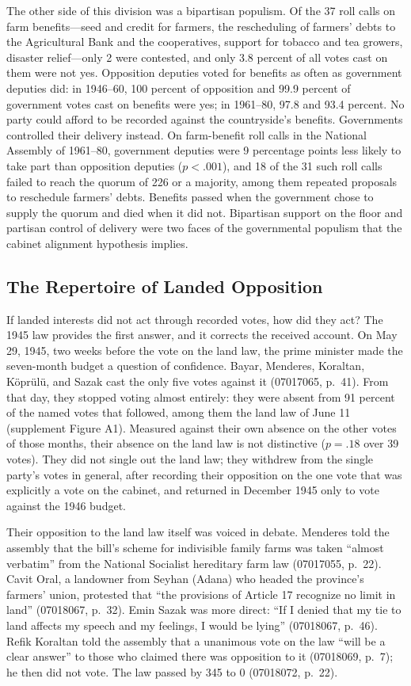 \documentclass[12pt]{article}
\begin{document}
The other side of this division was a bipartisan populism. Of the 37 roll calls on farm benefits---seed and credit for farmers, the rescheduling of farmers' debts to the Agricultural Bank and the cooperatives, support for tobacco and tea growers, disaster relief---only 2 were contested, and only 3.8 percent of all votes cast on them were not yes. Opposition deputies voted for benefits as often as government deputies did: in 1946--60, 100 percent of opposition and 99.9 percent of government votes cast on benefits were yes; in 1961--80, 97.8 and 93.4 percent. No party could afford to be recorded against the countryside's benefits. Governments controlled their delivery instead. On farm-benefit roll calls in the National Assembly of 1961--80, government deputies were 9 percentage points less likely to take part than opposition deputies ($p<.001$), and 18 of the 31 such roll calls failed to reach the quorum of 226 or a majority, among them repeated proposals to reschedule farmers' debts. Benefits passed when the government chose to supply the quorum and died when it did not. Bipartisan support on the floor and partisan control of delivery were two faces of the governmental populism that the cabinet alignment hypothesis implies.

\subsection*{The Repertoire of Landed Opposition}

If landed interests did not act through recorded votes, how did they act? The 1945 law provides the first answer, and it corrects the received account. On May 29, 1945, two weeks before the vote on the land law, the prime minister made the seven-month budget a question of confidence. Bayar, Menderes, Koraltan, Köprülü, and Sazak cast the only five votes against it (07017065, p.~41). From that day, they stopped voting almost entirely: they were absent from 91 percent of the named votes that followed, among them the land law of June 11 (supplement Figure A1). Measured against their own absence on the other votes of those months, their absence on the land law is not distinctive ($p=.18$ over 39 votes). They did not single out the land law; they withdrew from the single party's votes in general, after recording their opposition on the one vote that was explicitly a vote on the cabinet, and returned in December 1945 only to vote against the 1946 budget.

Their opposition to the land law itself was voiced in debate. Menderes told the assembly that the bill's scheme for indivisible family farms was taken ``almost verbatim'' from the National Socialist hereditary farm law (07017055, p.~22). Cavit Oral, a landowner from Seyhan (Adana) who headed the province's farmers' union, protested that ``the provisions of Article 17 recognize no limit in land'' (07018067, p.~32). Emin Sazak was more direct: ``If I denied that my tie to land affects my speech and my feelings, I would be lying'' (07018067, p.~46). Refik Koraltan told the assembly that a unanimous vote on the law ``will be a clear answer'' to those who claimed there was opposition to it (07018069, p.~7); he then did not vote. The law passed by 345 to 0 (07018072, p.~22).
\end{document}
